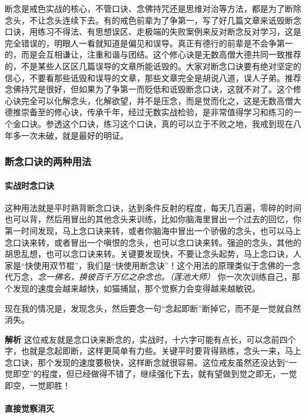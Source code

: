 断念是戒色实战的核心，不管口诀、念佛持咒还是思维对治等方法，都是为了断除念头，不让念头连续下去。有的戒色前辈为了争第一，写了好几篇文章来诋毁断念口诀，用练习不得法、有思想误区、走极端的失败案例来反对断念反对学习，这是完全错误的，明眼人一看就知道是偏见和误导。真正有德行的前辈是不会争第一的，而是会互相谦让，注重和谐与团结。这个修心诀是无数高僧大德共同一致推荐的，不是某些人区区几篇误导的文章所能诋毁的。大家对断念口诀要有绝对坚定的信心，不要看那些诋毁和误导的文章，那些文章完全是胡说八道，误人子弟。推荐念佛持咒是很好，但如果为了争第一而贬低和诋毁断念口诀，这就不对了。这个修心诀完全可以化解念头，化解欲望，并不是压念，而是觉而化之，这是无数高僧大德推崇备至的修心诀，传承千年，经过无数实战检验，是非常值得学习和练习的一个金口诀。参透这个口诀，练习这个口诀，真的可以立于不败之地，我戒到现在八年多一次未破，就是最好的明证。

\subsubsection{断念口诀的两种用法}

\paragraph{实战时念口诀}

这种用法就是平时熟背断念口诀，达到条件反射的程度，每天几百遍，零碎的时间也可以背，然后用冒出的其他念头来训练，比如你脑海里冒出一个过去的回忆，你第一时间发现，马上念口诀来转，或者你脑海中冒出一个骄傲的念头，也可以马上念口诀来转，或者冒出一个嗔恨的念头，也可以念口诀来转。强迫的念头，其他的胡思乱想，也可以念口诀来转。关键要发现快，不要让念头起势，马上念口诀，人家是“快使用双节棍”，我们是“快使用断念诀”！这个用法的原理类似于念佛的一念代万念，\textit{念一佛名，换彼百千万亿之杂念也。（莲池大师）} 你一次次训练自己，那个发现的速度会越来越快，如猫捕鼠，那个觉察力会变得越来越敏锐。

\begin{case}[实战时念口诀]
    现在我的情况是，发现念头，然后要念一句“念起即断”断掉它，而不是一觉就自然消失。

    \textbf{解析} 这位戒友就是念口诀来断念的，实战时，十六字可能有点长，可以念前四个字，也就是念起即断，这样更简单有力些。关键平时要背得熟练，念头一来，马上念口诀，那个发现的速度要极快，这样断念就很容易。这位戒友虽然还没达到“一觉即空”的程度，但已经做得不错了，继续强化下去，就有望做到觉之即无，一觉即空，一觉即胜！
\end{case}

\paragraph{直接觉察消灭}

